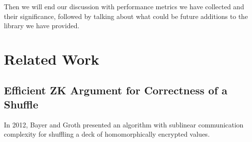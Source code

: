 \documentclass[12pt,a4paper]{report}
\begin{document}
Then we will end our discussion with performance metrics we have collected and their significance,
followed by talking about what could be future additions to the library we have provided.




\chapter{Related Work}
\section{Efficient ZK Argument for Correctness of a Shuffle}
In 2012, Bayer and Groth\cite{bgshuffle} presented an algorithm with sublinear 
communication complexity for shuffling a deck of homomorphically encrypted values.
\end{document}
